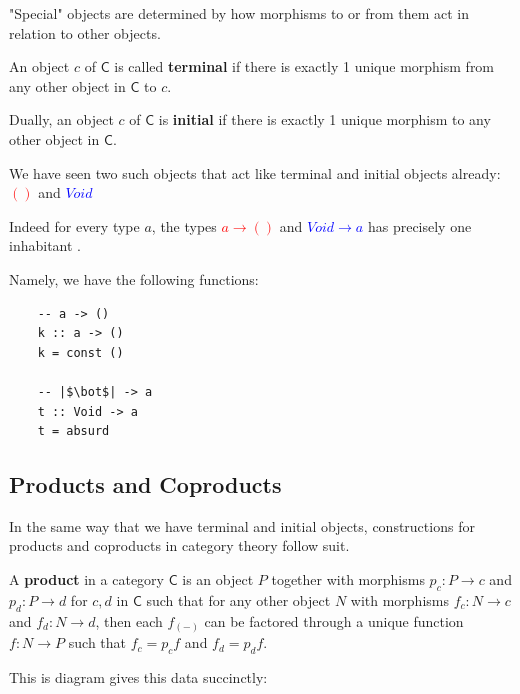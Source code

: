\documentclass[tikz]{beamer}
\newcommand{\cat}[1]{\bm{ \mathsf{#1} }}
\newcommand{\cc}{\cat{C}}
\newcommand{\mred}[1]{\textcolor{red}{$#1$}}
\newcommand{\mblue}[1]{\textcolor{blue}{$#1$}}
\theoremstyle{definition}
\begin{document}
\frame
{
	"Special" objects are determined by how morphisms to or from them act in relation to other objects. 
}

\frame
{
	\begin{definition}
		An object $c$ of $\cc$ is called \textbf{terminal} if there is exactly 1 unique morphism from any other object in $\cc$ to $c$. 
		
		Dually,  an object $c$ of $\cc$ is \textbf{initial} if there is exactly 1 unique morphism to any other object in $\cc$. 
	\end{definition}
}

\frame
{
	We have seen two such objects that act like terminal and initial objects already: \mred{()} and \mblue{Void}
}

\frame
{
	Indeed for every type $a$, the types \mred{a \to ()} and \mblue{Void \to a} has precisely one inhabitant . 
}

\begin{frame}[fragile]

Namely, we have the following functions: 

	\begin{verbatim}
	-- a -> ()
	k :: a -> ()
	k = const ()
	
	-- |$\bot$| -> a
	t :: Void -> a
	t = absurd
	\end{verbatim}
\end{frame}

\subsection{Products and Coproducts}

\frame
{

	In the same way that we have terminal and initial objects, constructions for products and coproducts in category theory follow suit.
}

\frame
{
	\begin{definition}[Product]
	
		A \textbf{product} in a category $\cc$ is an object $P$ together with morphisms $p_c : P \to c$ and $p_d : P \to d$ for $c,d$ in $\cc$ such that for any other object $N$ with morphisms $f_c : N \to c$ and $f_d : N \to d$, then each $f_{(-)}$ can be factored through a unique function $f : N \to P$ such that $f_c = p_cf$ and $f_d = p_df$. 
	\end{definition}
}

\begin{frame}[fragile]
	This is diagram gives this data succinctly: 
	
	\begin{center}
	\end{center}
\end{frame}
\end{document}
